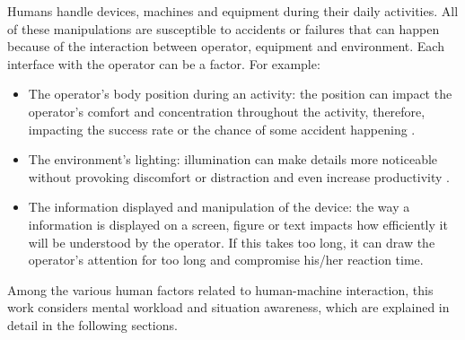 Humans handle devices, machines and equipment during their daily activities. All of these manipulations are susceptible to accidents or failures that can happen because of the interaction between operator, equipment and environment. Each interface with the operator can be a factor. For example:

\begin{itemize}
    \item The operator's body position during an activity: the position can impact the operator's comfort and concentration throughout the activity, therefore, impacting the success rate or the chance of some accident happening  \cite{sanders1998human}.
    
    \item The environment's lighting: illumination can make details more noticeable without provoking discomfort or distraction and even increase productivity  \cite{sanders1998human}.
    
    \item The information displayed and manipulation of the device: the way a information is displayed on a screen, figure or text impacts how efficiently it will be understood by the operator. If this takes too long, it can draw the operator's attention for too long and compromise his/her reaction time.
    
\end{itemize}

Among the various human factors related to human-machine interaction, this work considers mental workload and situation awareness, which are explained in detail in the following sections.